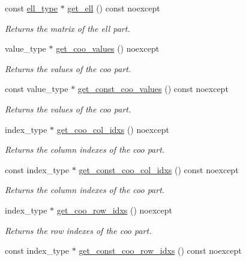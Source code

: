 \begin{DoxyCompactItemize}
const \hyperlink{classgko_1_1matrix_1_1Ell}{ell\+\_\+type} $\ast$ \hyperlink{classgko_1_1matrix_1_1Hybrid_afe9a3a9a801271d5ead4774fff7ffbd7}{get\+\_\+ell} () const noexcept
\begin{DoxyCompactList}\small\item\em Returns the matrix of the ell part. \end{DoxyCompactList}\item 
value\+\_\+type $\ast$ \hyperlink{classgko_1_1matrix_1_1Hybrid_a8513b46a3abb728b725fc26af81d09b9}{get\+\_\+coo\+\_\+values} () noexcept
\begin{DoxyCompactList}\small\item\em Returns the values of the coo part. \end{DoxyCompactList}\item 
const value\+\_\+type $\ast$ \hyperlink{classgko_1_1matrix_1_1Hybrid_a9b066402b6f3727196c9945a80f08a6e}{get\+\_\+const\+\_\+coo\+\_\+values} () const noexcept
\begin{DoxyCompactList}\small\item\em Returns the values of the coo part. \end{DoxyCompactList}\item 
index\+\_\+type $\ast$ \hyperlink{classgko_1_1matrix_1_1Hybrid_a327548f42867b201cd469f3a21145c87}{get\+\_\+coo\+\_\+col\+\_\+idxs} () noexcept
\begin{DoxyCompactList}\small\item\em Returns the column indexes of the coo part. \end{DoxyCompactList}\item 
const index\+\_\+type $\ast$ \hyperlink{classgko_1_1matrix_1_1Hybrid_ab637e1576b6449407ee2b57ac203e0f7}{get\+\_\+const\+\_\+coo\+\_\+col\+\_\+idxs} () const noexcept
\begin{DoxyCompactList}\small\item\em Returns the column indexes of the coo part. \end{DoxyCompactList}\item 
index\+\_\+type $\ast$ \hyperlink{classgko_1_1matrix_1_1Hybrid_aa64e1442587df4be9bc55f38d91be26d}{get\+\_\+coo\+\_\+row\+\_\+idxs} () noexcept
\begin{DoxyCompactList}\small\item\em Returns the row indexes of the coo part. \end{DoxyCompactList}\item 
const index\+\_\+type $\ast$ \hyperlink{classgko_1_1matrix_1_1Hybrid_ae0d4b0c9151011ef879055f504f79f63}{get\+\_\+const\+\_\+coo\+\_\+row\+\_\+idxs} () const noexcept

\end{DoxyCompactItemize}
